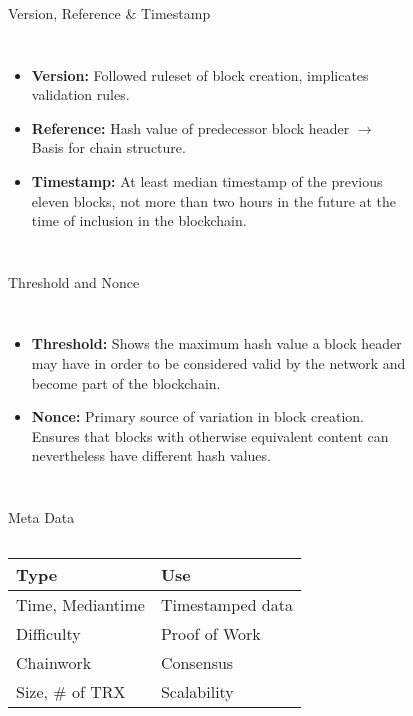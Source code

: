 \documentclass[]{beamer}
\begin{document}
\begin{frame}{Version, Reference \& Timestamp}
	\begin{columns}
		\begin{itemize}
			\item \textbf{Version:} Followed ruleset of block creation, implicates validation rules.
			\item \textbf{Reference:} Hash value of predecessor block header $\rightarrow$ Basis for chain structure.
			\item \textbf{Timestamp:} At least median timestamp of the previous eleven blocks, not more than two hours in the future at the time of inclusion in the blockchain. 
		\end{itemize}
		\begin{figure}
			
		\end{figure}
	\end{columns}
\end{frame}


\begin{frame}{Threshold and Nonce}
	\begin{columns}
	\column{0.7\textwidth}
		\begin{itemize}
			\item \textbf{Threshold:} Shows the maximum hash value a block header may have in order to be considered valid by the network and become part of the blockchain.
			\item \textbf{Nonce:} Primary source of variation in block creation. Ensures that blocks with otherwise equivalent content can nevertheless have different hash values.
		\end{itemize}
	\column{0.3\textwidth}
		\begin{figure}
			
		\end{figure}
	\end{columns}
\end{frame}


\begin{frame}{Meta Data}
	\begin{columns}
	\column{0.6\textwidth}
		\begin{tabular}{l|l}
			\textbf{Type} & \textbf{Use} \\
			\hline
			Time, Mediantime & Timestamped data \\
			Difficulty & Proof of Work \\
			Chainwork & Consensus \\
			Size, \# of TRX & Scalability
		\end{tabular}
	\column{0.4\textwidth}
		\begin{figure}
			\begin{tikzpicture}[domain=-8:8,scale=1.2, every node/.style={scale=1.2}]
  				
  			\end{tikzpicture}
			\end{figure}
	\end{columns}
\end{frame}
\end{document}
